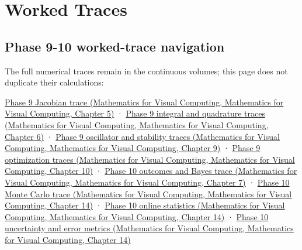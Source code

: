 \hypertarget{appendix-92ff77d4dfdc}{}\label{referencestart:appendix-92ff77d4dfdc}
\section{Worked Traces}\label{appendix-92ff77d4dfdc-worked-traces}

\subsection{Phase 9-10 worked-trace navigation}\label{appendix-92ff77d4dfdc-phase-9-10-worked-trace-navigation}

The full numerical traces remain in the continuous volumes; this page does not duplicate their calculations:

\href{../02-Mathematics-for-Visual-Computing/main.pdf\#nameddest=02-foundations-ii-ch021-jacobians-curvature-and-local-approximation}{Phase 9 Jacobian trace (Mathematics for Visual Computing, Mathematics for Visual Computing, Chapter 5)} · \href{../02-Mathematics-for-Visual-Computing/main.pdf\#nameddest=02-foundations-ii-ch022-integration-and-quadrature}{Phase 9 integral and quadrature traces (Mathematics for Visual Computing, Mathematics for Visual Computing, Chapter 6)} · \href{../02-Mathematics-for-Visual-Computing/main.pdf\#nameddest=02-foundations-ii-ch025-odes-and-numerical-simulation}{Phase 9 oscillator and stability traces (Mathematics for Visual Computing, Mathematics for Visual Computing, Chapter 9)} · \href{../02-Mathematics-for-Visual-Computing/main.pdf\#nameddest=02-foundations-ii-ch026-optimization-and-inverse-problems}{Phase 9 optimization traces (Mathematics for Visual Computing, Mathematics for Visual Computing, Chapter 10)} · \href{../02-Mathematics-for-Visual-Computing/main.pdf\#nameddest=02-foundations-ii-ch023-a-probability-model-begins-with-possible-outcomes}{Phase 10 outcomes and Bayes trace (Mathematics for Visual Computing, Mathematics for Visual Computing, Chapter 7)} · \href{../02-Mathematics-for-Visual-Computing/main.pdf\#nameddest=02-foundations-ii-ch030-monte-carlo-estimates-trade-computation-for-uncertainty}{Phase 10 Monte Carlo trace (Mathematics for Visual Computing, Mathematics for Visual Computing, Chapter 14)} · \href{../02-Mathematics-for-Visual-Computing/main.pdf\#nameddest=02-foundations-ii-ch030-finite-samples-need-stable-descriptive-statistics}{Phase 10 online statistics (Mathematics for Visual Computing, Mathematics for Visual Computing, Chapter 14)} · \href{../02-Mathematics-for-Visual-Computing/main.pdf\#nameddest=02-foundations-ii-ch030-inference-and-error-metrics-need-explicit-assumptions}{Phase 10 uncertainty and error metrics (Mathematics for Visual Computing, Mathematics for Visual Computing, Chapter 14)}

